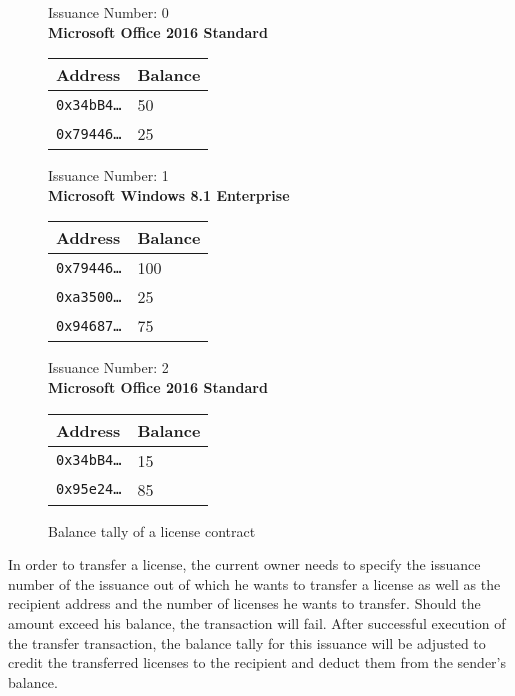 \documentclass[a4paper]{article}
\begin{document}
\begin{figure}
  \begin{multicols}{3}
    \centering
    Issuance Number: 0 \\
    \textbf{Microsoft Office 2016 Standard} \\[3mm]
    
    \begin{tabular}{l|l}
      Address & Balance \\
      \hline
      \texttt{0x34bB4…} & 50 \\
      \texttt{0x79446…} & 25
    \end{tabular}
    
    \columnbreak
    
    Issuance Number: 1 \\
    \textbf{Microsoft Windows 8.1 Enterprise} \\[3mm]
    \begin{tabular}{l|l}
      Address & Balance \\
      \hline
      \texttt{0x79446…} & 100 \\
      \texttt{0xa3500…} & 25 \\
      \texttt{0x94687…} & 75 \\
    \end{tabular}
    
    Issuance Number: 2 \\
    \textbf{Microsoft Office 2016 Standard} \\[3mm]
    \begin{tabular}{l|l}
      Address & Balance \\
      \hline
      \texttt{0x34bB4…} & 15 \\
      \texttt{0x95e24…} & 85
    \end{tabular}
  \end{multicols}
  \caption{Balance tally of a license contract}
  \label{fig:balanceTally}
\end{figure}

In order to transfer a license, the current owner needs to specify the issuance number of the issuance out of which he wants to transfer a license as well as the recipient address and the number of licenses he wants to transfer. Should the amount exceed his balance, the transaction will fail. After successful execution of the transfer transaction, the balance tally for this issuance will be adjusted to credit the transferred licenses to the recipient and deduct them from the sender's balance.
\end{document}
